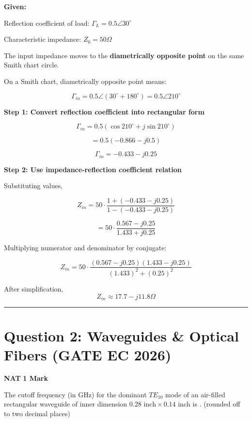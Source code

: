 \documentclass[11pt,a4paper]{article}
\begin{document}
\begin{tcolorbox}[solbox, title=Detailed Solution -- Question 1]
\textbf{Given:}

Reflection coefficient of load: $\Gamma_L=0.5\angle30^\circ$

Characteristic impedance: $Z_0=50\Omega$

The input impedance moves to the \textbf{diametrically opposite point} on the same Smith chart circle.

On a Smith chart, diametrically opposite point means:

\[
\Gamma_{in}=0.5\angle(30^\circ+180^\circ)
=
0.5\angle210^\circ
\]

\textbf{Step 1: Convert reflection coefficient into rectangular form}

\[
\Gamma_{in}
=
0.5(\cos210^\circ+j\sin210^\circ)
\]

\[
=
0.5(-0.866-j0.5)
\]

\[
\Gamma_{in}
=
-0.433-j0.25
\]

\textbf{Step 2: Use impedance-reflection coefficient relation}

Substituting values,

\[
Z_{in}
=
50\cdot
\frac{1+(-0.433-j0.25)}
{1-(-0.433-j0.25)}
\]

\[
=
50\cdot
\frac{0.567-j0.25}
{1.433+j0.25}
\]

Multiplying numerator and denominator by conjugate:

\[
Z_{in}
=
50\cdot
\frac{(0.567-j0.25)(1.433-j0.25)}
{(1.433)^2+(0.25)^2}
\]

After simplification, 
\[
Z_{in}
\approx
17.7-j11.8\Omega
\]
\end{tcolorbox}

\vspace{1.5em}
\hrule
\vspace{1.5em}

\section*{Question 2: Waveguides \& Optical Fibers (GATE EC 2026)}
\noindent \textbf{\color{primary}NAT} \hfill \textbf{\color{secondary}1 Mark}


\noindent The cutoff frequency (in GHz) for the dominant $TE_{10}$ mode of an air-filled rectangular waveguide of inner dimension $0.28 \text{ inch} \times 0.14 \text{ inch}$ is \underline{\hspace{1.5cm}}. (rounded off to two decimal places)
\end{document}
